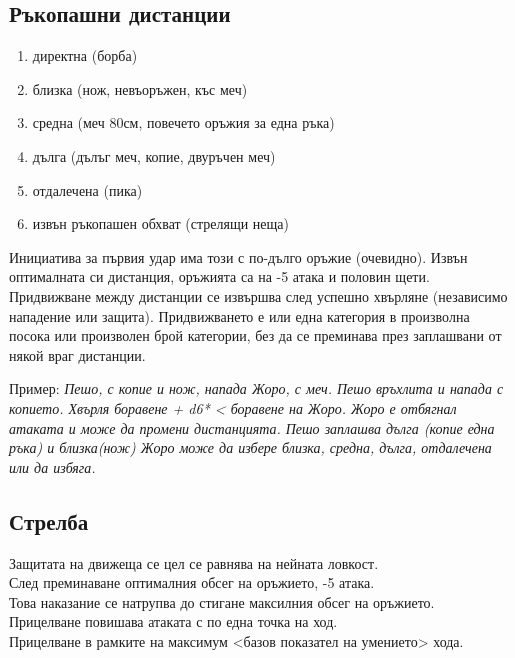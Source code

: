 \subsection{Ръкопашни дистанции}
\begin{multicols}{2}
\begin{enumerate}
\item{директна (борба)}
\item{близка (нож, невъоръжен, къс меч)}
\item{средна (меч 80см, повечето оръжия за една ръка)}
\item{дълга (дълъг меч, копие, двуръчен меч)}
\item{отдалечена (пика)}
\item{извън ръкопашен обхват (стрелящи неща)}
\end{enumerate}
Инициатива за първия удар има този с по-дълго оръжие (очевидно).
Извън оптималната си дистанция, оръжията са на -5 атака и половин щети.
Придвижване между дистанции се извършва след успешно хвърляне (независимо нападение или защита).
Придвижването е или една категория в произволна посока или произволен брой категории, без да се преминава през заплашвани от някой враг дистанции. 
\end{multicols}
Пример:
\emph{Пешо, с копие и нож, напада Жоро, с меч.
Пешо връхлита и напада с копието.
Хвърля боравене + d6* < боравене на Жоро.
Жоро е отбягнал атаката и може да промени дистанцията.
Пешо заплашва дълга (копие една ръка) и близка(нож)
Жоро може да избере близка, средна, дълга, отдалечена или да избяга.
}

\subsection{Стрелба}
Защитата на движеща се цел се равнява на нейната ловкост.  \\
След преминаване оптималния обсег на оръжието, -5 атака.  \\
Това наказание се натрупва до стигане максилния обсег на оръжието.  \\
Прицелване повишава атаката с по една точка на ход.  \\
Прицелване в рамките на максимум <базов показател на умението> хода.

